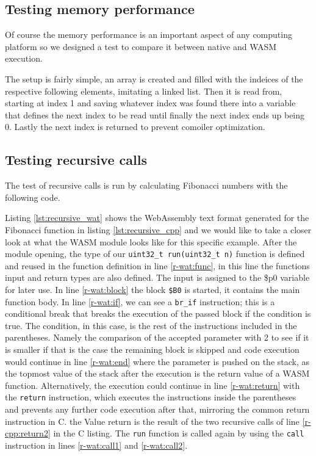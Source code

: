 \subsection{Testing memory performance}
Of course the memory performance is an important aspect of any computing platform so we designed a test to compare it between native and WASM execution.

The setup is fairly simple, an array is created and filled with the indeices of the respective following elements, imitating a linked list. Then it is read from, starting at index 1 and saving whatever index was found there into a variable that defines the next index to be read until finally the next index ends up being 0. Lastly the next index is returned to prevent comoiler optimization.

\subsection{Testing recursive calls}
The test of recursive calls is run by calculating Fibonacci numbers with the following code.


Listing \ref{lst:recursive_wat} shows the WebAssembly text format generated for the Fibonacci function in listing \ref{lst:recursive_cpp} and we would like to take a closer look at what the WASM module looks like for this specific example. After the module opening, the type of our \lstinline{uint32_t run(uint32_t n)} function is defined and reused in the function definition in line \ref{r-wat:func}, in this line the functions input and return types are also defined. The input is assigned to the \$p0 variable for later use. In line \ref{r-wat:block} the block \lstinline{$B0} is started, it contains the main function body. In line \ref{r-wat:if}, we can see a \lstinline{br_if} instruction; this is a conditional break that breaks the execution of the passed block if the condition is true. The condition, in this case, is the rest of the instructions included in the parentheses. Namely the comparison of the accepted parameter with 2 to see if it is smaller if that is the case the remaining block is skipped and code execution would continue in line \ref{r-wat:end} where the parameter is pushed on the stack, as the topmost value of the stack after the execution is the return value of a WASM function. Alternatively, the execution could continue in line \ref{r-wat:return} with the \lstinline{return} instruction, which executes the instructions inside the parentheses and prevents any further code execution after that, mirroring the common return instruction in C. the Value return is the result of the two recursive calls of line \ref{r-cpp:return2} in the C listing. The \lstinline{run} function is called again by using the \lstinline{call} instruction in lines \ref{r-wat:call1} and \ref{r-wat:call2}.

